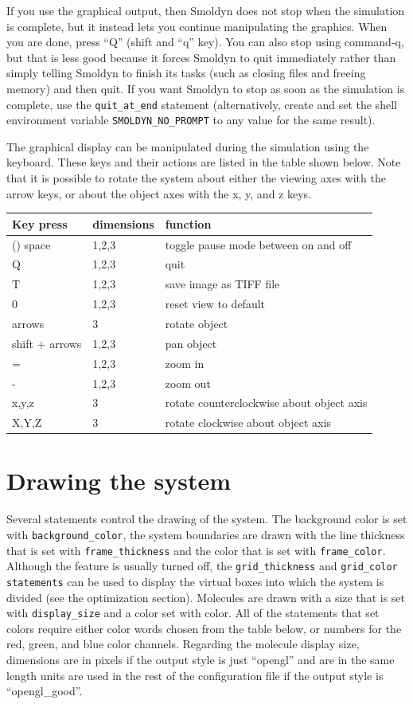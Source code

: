 \documentclass {scrbook}
\newcommand {\ttt} {\texttt}
\begin{document}
If you use the graphical output, then Smoldyn does not stop when the simulation is complete, but it instead lets you continue manipulating the graphics. When you are done, press ``Q'' (shift and ``q'' key). You can also stop using command-q, but that is less good because it forces Smoldyn to quit immediately rather than simply telling Smoldyn to finish its tasks (such as closing files and freeing memory) and then quit. If you want Smoldyn to stop as soon as the simulation is complete, use the \ttt{quit\_at\_end} statement (alternatively, create and set the shell environment variable \ttt{SMOLDYN\_NO\_PROMPT} to any value for the same result).

The graphical display can be manipulated during the simulation using the keyboard. These keys and their actions are listed in the table shown below. Note that it is possible to rotate the system about either the viewing axes with the arrow keys, or about the object axes with the x, y, and z keys.

\begin{longtable}[c]{lll}
Key press & dimensions & function\\
\hline()
space & 1,2,3 & toggle pause mode between on and off\\
Q & 1,2,3 & quit\\
T & 1,2,3 & save image as TIFF file\\
0 & 1,2,3 & reset view to default\\
arrows & 3 & rotate object\\
shift + arrows & 1,2,3 & pan object\\
= & 1,2,3 & zoom in\\
- & 1,2,3 & zoom out\\
x,y,z & 3 & rotate counterclockwise about object axis\\
X,Y,Z & 3 & rotate clockwise about object axis\\
\end{longtable}

\section{Drawing the system}

Several statements control the drawing of the system. The background color is set with \ttt{background\_color}, the system boundaries are drawn with the line thickness that is set with \ttt{frame\_thickness} and the color that is set with \ttt{frame\_color}. Although the feature is usually turned off, the \ttt{grid\_thickness} and \ttt{grid\_color statements} can be used to display the virtual boxes into which the system is divided (see the optimization section). Molecules are drawn with a size that is set with \ttt{display\_size} and a color set with color. All of the statements that set colors require either color words chosen from the table below, or numbers for the red, green, and blue color channels. Regarding the molecule display size, dimensions are in pixels if the output style is just ``opengl'' and are in the same length units are used in the rest of the configuration file if the output style is ``opengl\_good''.
\end{document}
